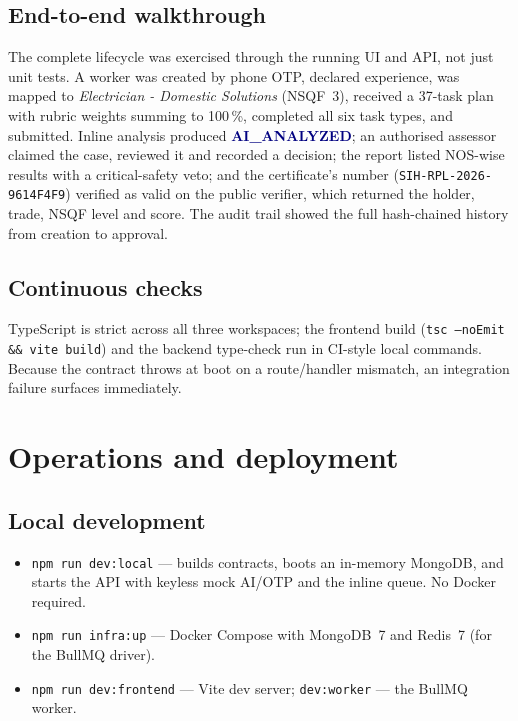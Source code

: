 \documentclass[11pt,a4paper]{article}
\newcommand{\code}[1]{\texttt{\small #1}}
\newcommand{\status}[1]{\textcolor{navy}{\textbf{#1}}}
\begin{document}
\subsection{End-to-end walkthrough}
The complete lifecycle was exercised through the running UI and API, not just
unit tests. A worker was created by phone OTP, declared experience, was mapped
to \emph{Electrician - Domestic Solutions} (NSQF~3), received a 37-task plan
with rubric weights summing to 100\,\%, completed all six task types, and
submitted. Inline analysis produced \status{AI\_ANALYZED}; an authorised
assessor claimed the case, reviewed it and recorded a decision; the report
listed NOS-wise results with a critical-safety veto; and the certificate's
number (\code{SIH-RPL-2026-9614F4F9}) verified as valid on the public
verifier, which returned the holder, trade, NSQF level and score. The audit
trail showed the full hash-chained history from creation to approval.

\subsection{Continuous checks}
TypeScript is strict across all three workspaces; the frontend build
(\code{tsc --noEmit \&\& vite build}) and the backend type-check run in CI-style
local commands. Because the contract throws at boot on a route/handler
mismatch, an integration failure surfaces immediately.

\section{Operations and deployment}
\subsection{Local development}
\begin{itemize}
\item \code{npm run dev:local} --- builds contracts, boots an in-memory
      MongoDB, and starts the API with keyless mock AI/OTP and the inline
      queue. No Docker required.
\item \code{npm run infra:up} --- Docker Compose with MongoDB~7 and
      Redis~7 (for the BullMQ driver).
\item \code{npm run dev:frontend} --- Vite dev server; \code{dev:worker} ---
      the BullMQ worker.
\end{itemize}
\end{document}
